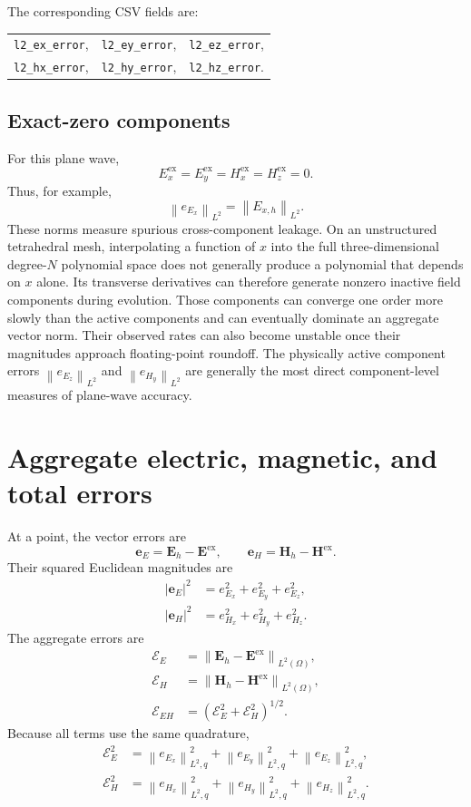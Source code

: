 \documentclass[11pt]{article}
\newcommand{\vect}[1]{\boldsymbol{#1}}
\newcommand{\norm}[1]{\left\lVert #1 \right\rVert}
\newcommand{\abs}[1]{\left| #1 \right|}
\newcommand{\code}[1]{\nolinkurl{#1}}
\newcommand{\Eex}{\vect E^{\mathrm{ex}}}
\newcommand{\Hex}{\vect H^{\mathrm{ex}}}
\newcommand{\Eh}{\vect E_h}
\newcommand{\Hh}{\vect H_h}
\begin{document}
The corresponding CSV fields are:
\begin{center}
\begin{tabular}{lll}
  \code{l2_ex_error},&
  \code{l2_ey_error},&
  \code{l2_ez_error},\\
  \code{l2_hx_error},&
  \code{l2_hy_error},&
  \code{l2_hz_error}.
\end{tabular}
\end{center}

\subsection{Exact-zero components}

For this plane wave,
\[
  E_x^{\mathrm{ex}}=E_y^{\mathrm{ex}}
  =H_x^{\mathrm{ex}}=H_z^{\mathrm{ex}}=0.
\]
Thus, for example,
\[
  \norm{e_{E_x}}_{L^2}
  =\norm{E_{x,h}}_{L^2}.
\]
These norms measure spurious cross-component leakage. On an unstructured
tetrahedral mesh, interpolating a function of \(x\) into the full
three-dimensional degree-\(N\) polynomial space does not generally produce a
polynomial that depends on \(x\) alone. Its transverse derivatives can
therefore generate nonzero inactive field components during evolution. Those
components can converge one order more slowly than the active components and
can eventually dominate an aggregate vector norm. Their observed rates can
also become unstable once their magnitudes approach floating-point roundoff.
The physically active component errors
\(\norm{e_{E_z}}_{L^2}\) and \(\norm{e_{H_y}}_{L^2}\) are generally the most
direct component-level measures of plane-wave accuracy.

\section{Aggregate electric, magnetic, and total errors}

At a point, the vector errors are
\[
  \vect e_E=\Eh-\Eex,\qquad
  \vect e_H=\Hh-\Hex.
\]
Their squared Euclidean magnitudes are
\begin{align}
  \abs{\vect e_E}^2
    &=
    e_{E_x}^2+e_{E_y}^2+e_{E_z}^2,\\
  \abs{\vect e_H}^2
    &=
    e_{H_x}^2+e_{H_y}^2+e_{H_z}^2.
\end{align}
The aggregate errors are
\begin{align}
  \mathcal{E}_E
    &=\norm{\Eh-\Eex}_{L^2(\Omega)},\\
  \mathcal{E}_H
    &=\norm{\Hh-\Hex}_{L^2(\Omega)},\\
  \mathcal{E}_{EH}
    &=
    \left(
      \mathcal{E}_E^2+\mathcal{E}_H^2
    \right)^{1/2}.
\end{align}
Because all terms use the same quadrature,
\begin{align}
  \mathcal{E}_E^2
    &=
    \norm{e_{E_x}}_{L^2,q}^2+
    \norm{e_{E_y}}_{L^2,q}^2+
    \norm{e_{E_z}}_{L^2,q}^2,\\
  \mathcal{E}_H^2
    &=
    \norm{e_{H_x}}_{L^2,q}^2+
    \norm{e_{H_y}}_{L^2,q}^2+
    \norm{e_{H_z}}_{L^2,q}^2.
\end{align}
\end{document}
